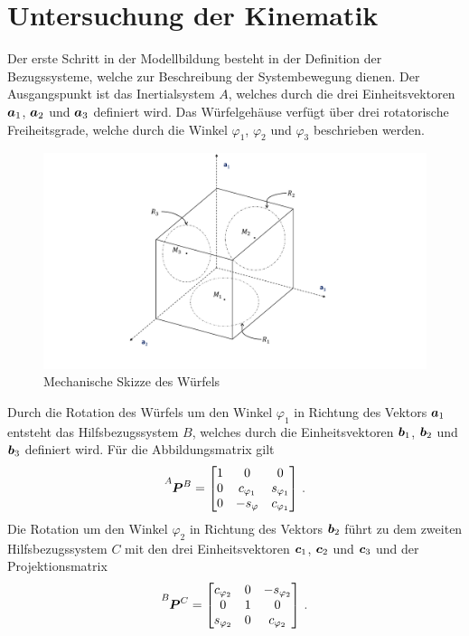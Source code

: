 \section{Untersuchung der Kinematik}
Der erste Schritt in der Modellbildung besteht in der Definition der Bezugssysteme, welche zur Beschreibung der Systembewegung dienen. Der Ausgangspunkt ist das Inertialsystem $A$, welches durch die drei Einheitsvektoren $\boldsymbol{a}_1$, $\boldsymbol{a}_2$ und $\boldsymbol{a}_3$ definiert wird. Das Würfelgehäuse verfügt über drei rotatorische Freiheitsgrade, welche durch die Winkel $\varphi_1$, $\varphi_2$ und $\varphi_3$ beschrieben werden. 
\begin{figure}[!h]
\centering
\includegraphics[width=\linewidth, trim={3cm 1.5cm 4cm 0cm}, clip]{img/MechAufbau3D}
\caption{Mechanische Skizze des Würfels}
\end{figure}
Durch die Rotation des Würfels um den Winkel $\varphi_1$ in Richtung des Vektors $\boldsymbol{a}_1$ entsteht das Hilfsbezugssystem $B$, welches durch die Einheitsvektoren $\boldsymbol{b}_1$, $\boldsymbol{b}_2$ und $\boldsymbol{b}_3$ definiert wird. Für die Abbildungsmatrix gilt
\begin{equation}
\pMat{A}{B} = \begin{bmatrix}
1 & 0 & 0 \\ 0 & c_{\varphi_1} & s_{\varphi_1} \\ 0 & -s_{\varphi} & c_{\varphi_1}
\end{bmatrix} \,.
\end{equation}
Die Rotation um den Winkel $\varphi_2$ in Richtung des Vektors $\boldsymbol{b}_2$ führt zu dem zweiten Hilfsbezugssystem $C$ mit den drei Einheitsvektoren $\boldsymbol{c}_1$, $\boldsymbol{c}_2$ und $\boldsymbol{c}_3$ und der Projektionsmatrix
\begin{equation}
\pMat{B}{C} = \begin{bmatrix}
c_{\varphi_2} & 0 & -s_{\varphi_2} \\
0 & 1 & 0 \\
 s_{\varphi_2} & 0 & c_{\varphi_2}
\end{bmatrix} \,.
\end{equation}
